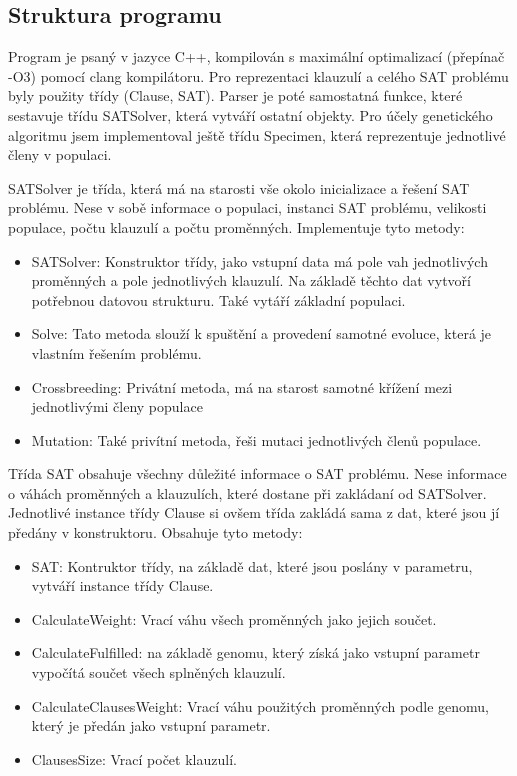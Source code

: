 \documentclass{article}
\begin{document}

    \subsection{Struktura programu}

    Program je psaný v jazyce C++, kompilován s maximální optimalizací (přepínač -O3) pomocí clang kompilátoru. Pro reprezentaci klauzulí a celého SAT problému byly
    použity třídy (Clause, SAT). Parser je poté samostatná funkce, které sestavuje třídu SATSolver, která vytváří ostatní objekty. Pro účely genetického algoritmu
    jsem implementoval ještě třídu Specimen, která reprezentuje jednotlivé členy v populaci.

    SATSolver je třída, která má na starosti vše okolo inicializace a řešení SAT problému. Nese v sobě informace o populaci, instanci SAT problému, velikosti populace,
    počtu klauzulí a počtu proměnných. Implementuje tyto metody:

    \begin{itemize}
        \item {SATSolver: Konstruktor třídy, jako vstupní data má pole vah jednotlivých proměnných a pole jednotlivých klauzulí. Na základě těchto dat vytvoří potřebnou
                datovou strukturu. Také vytáří základní populaci.}
        \item {Solve: Tato metoda slouží k spuštění a provedení samotné evoluce, která je vlastním řešením problému.}
        \item {Crossbreeding: Privátní metoda, má na starost samotné křížení mezi jednotlivými členy populace}
        \item {Mutation: Také privítní metoda, řeši mutaci jednotlivých členů populace.}
    \end{itemize}

    Třída SAT obsahuje všechny důležité informace o SAT problému. Nese informace o váhách proměnných a klauzulích, které dostane při zakládaní od SATSolver. Jednotlivé instance
    třídy Clause si ovšem třída zakládá sama z dat, které jsou jí předány v konstruktoru. Obsahuje tyto metody:

    \begin{itemize}
        \item {SAT: Kontruktor třídy, na základě dat, které jsou poslány v parametru, vytváří instance třídy Clause.}
        \item {CalculateWeight: Vrací váhu všech proměnných jako jejich součet.}
        \item {CalculateFulfilled: na základě genomu, který získá jako vstupní parametr vypočítá součet všech splněných klauzulí.}
        \item {CalculateClausesWeight: Vrací váhu použitých proměnných podle genomu, který je předán jako vstupní parametr.}
        \item {ClausesSize: Vrací počet klauzulí.}
    \end{itemize}
\end{document}
